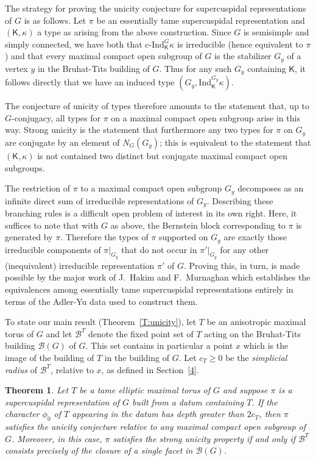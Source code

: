 \documentclass[12pt]{amsart}
\newcommand{\Res}{\mathrm{Res}} %
\newcommand{\Ind}{\mathrm{Ind}} %
\newcommand{\cind}{\textrm{c-}\mathrm{Ind}} %
\newcommand{\buil}{\mathcal{B}}
\newcommand{\KT}{\mathsf{K}}
\theoremstyle{plain}
\newtheorem*{theorem*}{Theorem}
\theoremstyle{definition}
\theoremstyle{remark}
\numberwithin{equation}{section}
\numberwithin{figure}{section}
\begin{document}
The strategy for proving the unicity conjecture for supercuspidal representations of $G$ is as follows.  Let $\pi$ be an essentially tame supercuspidal representation and $(\KT,\kappa)$ a type as arising from the above construction.  Since $G$ is semisimple and simply connected, we have both that  $\cind_{\KT}^G\kappa$ is irreducible (hence equivalent to $\pi$) and that 
every maximal compact open subgroup of $G$ is the stabilizer $G_y$ of a vertex $y$ in the Bruhat-Tits building of $G$.  Thus for any such $G_y$ containing $\KT$, it follows directly that we have an induced type $(G_y,\Ind_{\KT}^{G_y}\kappa)$.    


The conjecture of unicity of types therefore amounts to the statement that, up to $G$-conjugacy, all types for $\pi$ on a maximal compact open subgroup arise in this way.  
Strong unicity is the statement that furthermore any two types for $\pi$ on $G_y$ are conjugate by an element of $N_G(G_y)$; this is equivalent to the statement that $(\KT,\kappa)$ is not contained two distinct but conjugate maximal compact open subgroups.

 The restriction of $\pi$ to a maximal compact open subgroup $G_y$ %
  decomposes as an infinite direct sum of irreducible representations of $G_y$.  Describing these branching rules is a difficult open problem of interest in its own right.  Here, it suffices to note that with $G$ as above, the Bernstein block corresponding to $\pi$ is generated by $\pi$.  Therefore the types of $\pi$ supported on $G_y$ are exactly those irreducible components of $\pi|_{G_y}$ that do not occur in $\pi'|_{G_y}$ for any other (inequivalent) irreducible representation $\pi'$ of $G$.  Proving this, in turn, is made possible by the major work of J.~Hakim and F.~Murnaghan \cite{HakimMurnaghan2008} which establishes the equivalences among essentially tame supercuspidal representations entirely in terms of the Adler-Yu data used to construct them.


To state our main result (Theorem~\ref{T:unicity}), let $T$ be an anisotropic maximal torus of $G$ and let $\buil^T$ denote the fixed point set of $T$ acting on the Bruhat-Tits building $\buil(G)$ of $G$.  This set contains in particular a point $x$ which is the image of the building of $T$ in the building of $G$.  Let $c_T\geq 0$ be the \emph{simplicial radius} of $\buil^T$, relative to $x$, as defined in Section~\ref{4}.

\begin{theorem*}
Let $T$ be a tame elliptic maximal torus of $G$ and suppose $\pi$ is a supercuspidal representation of $G$ built from a datum containing $T$.  If the character $\phi_0$ of $T$ appearing in the datum has depth greater than $2c_T$, then $\pi$ satisfies the unicity conjecture relative to any maximal compact open subgroup of $G$.   Moreover, in this case, $\pi$ satisfies the strong unicity property if and only if $\buil^T$ consists precisely of the closure of a single facet in $\buil(G)$.
\end{theorem*}
\end{document}
